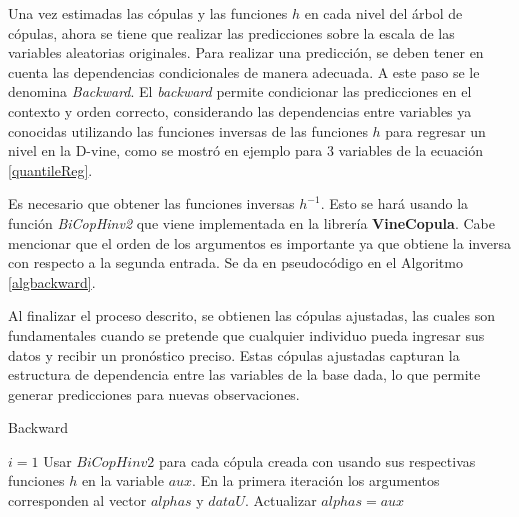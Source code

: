 Una vez estimadas las cópulas y las funciones $h$  en cada nivel del árbol de cópulas, ahora se tiene que realizar las predicciones sobre la escala de las variables aleatorias originales. Para realizar una predicción, se deben tener en cuenta las dependencias condicionales de manera adecuada. A este paso se le denomina \textit{Backward}. El \textit{backward} permite condicionar las predicciones en el contexto y orden correcto, considerando las dependencias entre variables ya conocidas utilizando las funciones inversas de las funciones $h$ para regresar un nivel en la D-vine, como se mostró en ejemplo para $3$ variables de la ecuación \eqref{quantileReg}.


Es necesario que obtener las funciones inversas $h^{-1}$. Esto se hará usando la función \textit{BiCopHinv2} que viene implementada en la librería \textbf{VineCopula}. Cabe mencionar que el orden de los argumentos es importante ya que obtiene la inversa con respecto a la segunda entrada. Se da en pseudocódigo en el Algoritmo \ref{algbackward}.

Al finalizar el proceso descrito, se obtienen las cópulas ajustadas, las cuales son fundamentales cuando se pretende que cualquier individuo pueda ingresar sus datos y recibir un pronóstico preciso. Estas cópulas ajustadas capturan la estructura de dependencia entre las variables de la base dada, lo que permite generar predicciones para nuevas observaciones. 

\begin{algorithm}[H]
      \caption{Backward}
      \label{algbackward}
      \begin{algorithmic}[1]  
        
        \State $i = 1$
          \State Usar $BiCopHinv2$ para cada cópula creada con usando sus respectivas funciones $h$ en la variable $aux$. En la primera iteración los argumentos corresponden al vector $alphas$ y $dataU$.
          \State Actualizar $alphas = aux$
        \EndWhile
       
      \end{algorithmic}
    \end{algorithm}

